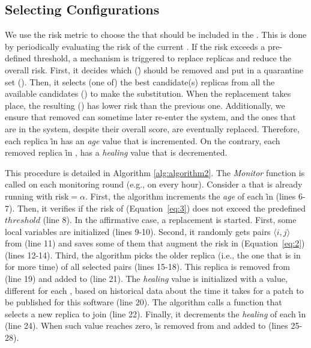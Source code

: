 \subsection{Selecting Configurations}
\label{sec:configurations}


We use the risk metric to choose the \replicas that should be included in the \configuration. 
This is done by periodically evaluating the risk of the current \configuration. 
If the risk exceeds a pre-defined threshold, a mechanism is triggered to replace replicas and reduce the overall risk.
First, it decides which \replica (\r) should be removed and put in a quarantine set (\QS). 
Then, it selects (one of) the best candidate(s) replicas from all the available candidates (\RS) to make the substitution.
When the replacement takes place, the resulting \configuration (\ES) has lower risk than the previous one.
Additionally, we ensure that removed \replicas can sometime later re-enter the system, and the ones that are in the system, despite their overall score, are eventually replaced.
Therefore, each replica \r in \ES has an \emph{age} value that is incremented. 
On the contrary, each removed replica \r in \QS, has a \emph{healing} value that is decremented.


This procedure is detailed in Algorithm \ref{alg:algorithm2}.
The \emph{Monitor} function is called on each monitoring round (e.g., on every hour).
Consider a \ES that is already running with risk$=\alpha$.
First, the algorithm increments the \emph{age} of each \r in \ES (lines 6-7).
Then, it verifies if the risk of \ES (Equation~\ref{eq:3}) does not exceed the predefined $\mathit{threshold}$ (line 8).
In the affirmative case, a \replica replacement is started.
First, some local variables are initialized (lines 9-10).
Second, it randomly gets pairs $\langle i,j \rangle$ from \ES (line 11) and saves some of them that augment the risk in \MAX (Equation~\ref{eq:2}) (lines 12-14). 
Third, the algorithm picks the older replica (i.e., the one that is in \ES for more time) of all selected pairs (lines 15-18). 
This replica is removed from \ES (line 19) and added to \QS (line 21).
The \emph{healing} value is initialized with a value, different for each \replica, based on historical data about the time it takes for a patch to be published for this software (line 20). 
The algorithm calls a function that selects a new replica to join \ES (line 22). Finally, it decrements the \emph{healing} of each \r in \QS (line 24). When such value reaches zero, \r is removed from \QS and added to \RS (lines 25-28).

